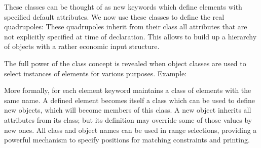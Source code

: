 These classes can be thought of as new keywords which define elements
with specified default attributes. We now use these classes to define
the real quadrupoles:  
These quadrupoles inherit from their class all attributes that are not
explicitly specified at time of declaration. 
This allows to build up a hierarchy of objects with a rather
economic input structure.  

The full power of the class concept is revealed when object classes are
used to select instances of elements for various purposes. Example:  

More formally, for each element keyword \madx maintains a class of
elements with the same name. A defined element becomes itself a class
which can be used to define new objects, which will become members of
this class. A new object inherits all attributes from its class; but its
definition may override some of those values by new ones. All class and
object names can be used in range selections, providing a powerful
mechanism to specify positions for matching constraints and printing.  




